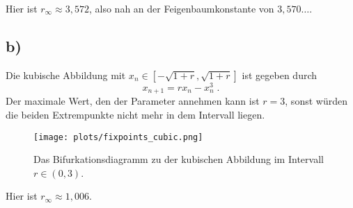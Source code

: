     Hier ist $r_{\infty} \approx 3,572$, also nah an der Feigenbaumkonstante von $3,570 \ldots$.

\subsection{b)}
    Die kubische Abbildung mit $x_n \in [-\sqrt{1+r}, \sqrt{1+r}]$ ist gegeben durch
    \begin{equation}
        x_{n+1} = r x_n - x_n^3 \;.
    \end{equation}
    Der maximale Wert, den der Parameter annehmen kann ist $r=3$, sonst würden die beiden Extrempunkte nicht mehr in dem Intervall liegen.

        \begin{figure}[H]
            \centering
            \texttt{[image: plots/fixpoints\_cubic.png]} \vspace{-0.3cm}
            \caption{Das Bifurkationsdiagramm zu der kubischen Abbildung im Intervall $r \in (0, 3)$.}
            \label{fig:fixpoints_cubic}
        \end{figure}
        \FloatBarrier

        Hier ist $r_{\infty} \approx 1,006$.